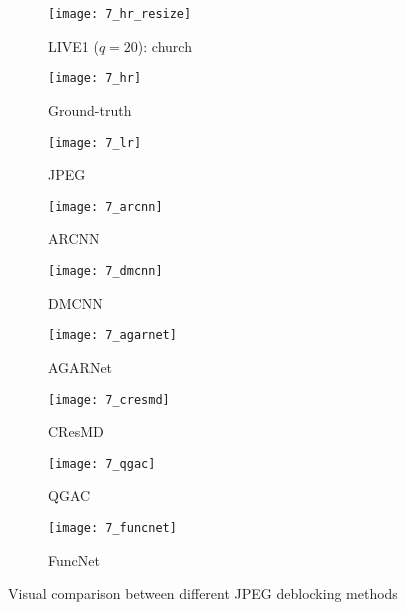 \documentclass{article}
\begin{document}
{\begin{figure}
\begin{minipage}{1\textwidth}
\begin{minipage}{0.30\textwidth}
\begin{subfigure}{0.98\columnwidth}
\texttt{[image: 7\_hr\_resize]}
\caption*{LIVE1 ($q=20$): church}
\end{subfigure}
\end{minipage}
\begin{minipage}{0.70\textwidth}
\begin{subfigure}{0.24\columnwidth}
\texttt{[image: 7\_hr]}
\caption*{Ground-truth}
\end{subfigure}
\begin{subfigure}{0.24\columnwidth}
\texttt{[image: 7\_lr]}
\caption*{JPEG}
\end{subfigure}
\begin{subfigure}{0.24\columnwidth}
\texttt{[image: 7\_arcnn]}
\caption*{ARCNN~\cite{dong2015compression}}
\end{subfigure}
\begin{subfigure}{0.24\columnwidth}
\texttt{[image: 7\_dmcnn]}
\caption*{DMCNN~\cite{zhang2018dmcnn}}
\end{subfigure}

\begin{subfigure}{0.24\columnwidth}
\texttt{[image: 7\_agarnet]}
\caption*{AGARNet~\cite{kim2020agarnet}}
\end{subfigure}
\begin{subfigure}{0.24\columnwidth}
\texttt{[image: 7\_cresmd]}
\caption*{CResMD~\cite{he2020interactive}}
\end{subfigure}
\begin{subfigure}{0.24\columnwidth}
\texttt{[image: 7\_qgac]}
\caption*{QGAC~\cite{ehrlich2020quantization}}
\end{subfigure}
\begin{subfigure}{0.24\columnwidth}
\texttt{[image: 7\_funcnet]}
\caption*{FuncNet}
\end{subfigure}
\end{minipage}
\end{minipage}
\caption{Visual comparison between different JPEG deblocking methods}
\label{fig:4}
\end{figure}
\clearpage
}
\end{document}
